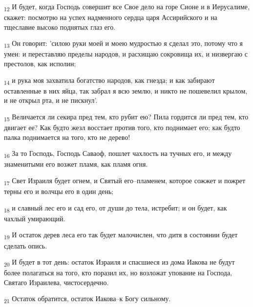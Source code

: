 \begin{tcolorbox}
\textsubscript{12} И будет, когда Господь совершит все Свое дело на горе Сионе и в Иерусалиме, скажет: посмотрю на успех надменного сердца царя Ассирийского и на тщеславие высоко поднятых глаз его.
\end{tcolorbox}
\begin{tcolorbox}
\textsubscript{13} Он говорит: 'силою руки моей и моею мудростью я сделал это, потому что я умен: и переставляю пределы народов, и расхищаю сокровища их, и низвергаю с престолов, как исполин;
\end{tcolorbox}
\begin{tcolorbox}
\textsubscript{14} и рука моя захватила богатство народов, как гнезда; и как забирают оставленные в них яйца, так забрал я всю землю, и никто не пошевелил крылом, и не открыл рта, и не пискнул'.
\end{tcolorbox}
\begin{tcolorbox}
\textsubscript{15} Величается ли секира пред тем, кто рубит ею? Пила гордится ли пред тем, кто двигает ее? Как будто жезл восстает против того, кто поднимает его; как будто палка поднимается на того, кто не дерево!
\end{tcolorbox}
\begin{tcolorbox}
\textsubscript{16} За то Господь, Господь Саваоф, пошлет чахлость на тучных его, и между знаменитыми его возжет пламя, как пламя огня.
\end{tcolorbox}
\begin{tcolorbox}
\textsubscript{17} Свет Израиля будет огнем, и Святый его--пламенем, которое сожжет и пожрет терны его и волчцы его в один день;
\end{tcolorbox}
\begin{tcolorbox}
\textsubscript{18} и славный лес его и сад его, от души до тела, истребит; и он будет, как чахлый умирающий.
\end{tcolorbox}
\begin{tcolorbox}
\textsubscript{19} И остаток дерев леса его так будет малочислен, что дитя в состоянии будет сделать опись.
\end{tcolorbox}
\begin{tcolorbox}
\textsubscript{20} И будет в тот день: остаток Израиля и спасшиеся из дома Иакова не будут более полагаться на того, кто поразил их, но возложат упование на Господа, Святаго Израилева, чистосердечно.
\end{tcolorbox}
\begin{tcolorbox}
\textsubscript{21} Остаток обратится, остаток Иакова--к Богу сильному.
\end{tcolorbox}

